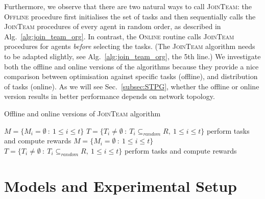 \documentclass{llncs}
\begin{document}
Furthermore, we observe that there are two natural ways to call \textsc{JoinTeam}: the \textsc{Offline} procedure first initialises the set of tasks and then sequentially calls the \textsc{JoinTeam} procedures of every agent in random order, as described in Alg.~\ref{alg:join_team_org}. In contrast, the \textsc{Online} routine calls \textsc{JoinTeam} procedures for agents \emph{before} selecting the tasks. (The \textsc{JoinTeam} algorithm needs to be adapted slightly, see Alg.~\ref{alg:join_team_org}, the 5th line.)  We investigate both the offline and online versions of the algorithms because they provide a nice comparison between optimisation against specific tasks (offline), and distribution of tasks (online). As we will see Sec.~\ref{subsec:STPG}, whether the offline or online version results in better performance depends on network topology.

\begin{algorithm}[h]
\caption{Offline and online versions of \textsc{JoinTeam} algorithm}
\label{alg:main_process}
\begin{scriptsize}
\begin{algorithmic}
 
  \State $M = \{M_i = \emptyset\ :\ 1\leq i \leq t\}$ 
  \State $T = \{T_i\neq \emptyset\ :\ T_i \subseteq_{random} R,\ 1\leq i \leq t\}$ 
    \State {}
  \EndFor
  \State perform tasks and compute rewards
\EndProcedure
\Statex
{} 
  \State $M = \{M_i = \emptyset\ :\ 1\leq i \leq t\}$ 
    \State {}
  \EndFor
  \State $T = \{T_i\neq \emptyset\ :\ T_i \subseteq_{random} R,\ 1\leq i \leq t\}$ 
  \State perform tasks and compute rewards
\EndProcedure
\end{algorithmic}
\end{scriptsize}
\end{algorithm}

\section{Models and Experimental Setup}
\end{document}
